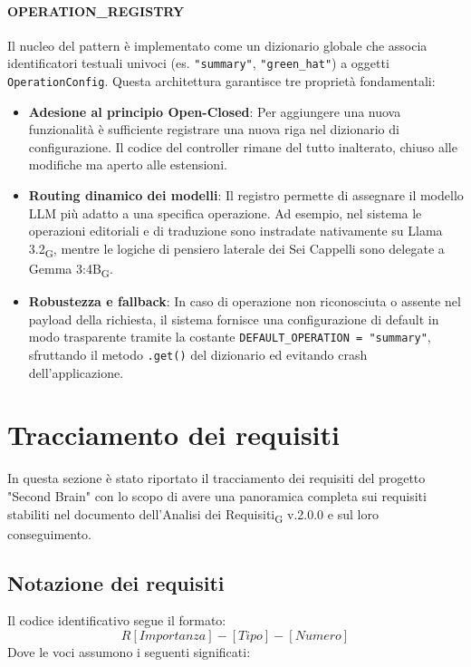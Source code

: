 \documentclass[11pt,a4paper]{article}
\newcommand{\gls}[1]{#1\textsubscript{G}}
\begin{document}
\paragraph{OPERATION\_REGISTRY}
Il nucleo del pattern è implementato come un dizionario globale che associa identificatori testuali univoci (es. \texttt{"summary"}, \texttt{"green\_hat"}) a oggetti \texttt{OperationConfig}. Questa architettura garantisce tre proprietà fondamentali:
\begin{itemize}
    \item \textbf{Adesione al principio Open-Closed}: Per aggiungere una nuova funzionalità è sufficiente registrare una nuova riga nel dizionario di configurazione. Il codice del controller rimane del tutto inalterato, chiuso alle modifiche ma aperto alle estensioni.
    \item \textbf{Routing dinamico dei modelli}: Il registro permette di assegnare il modello LLM più adatto a una specifica operazione. Ad esempio, nel sistema le operazioni editoriali e di traduzione sono instradate nativamente su \gls{Llama 3.2}, mentre le logiche di pensiero laterale dei Sei Cappelli sono delegate a \gls{Gemma 3:4B}.
    \item \textbf{Robustezza e fallback}: In caso di operazione non riconosciuta o assente nel payload della richiesta, il sistema fornisce una configurazione di default in modo trasparente tramite la costante \texttt{DEFAULT\_OPERATION = "summary"}, sfruttando il metodo \texttt{.get()} del dizionario ed evitando crash dell'applicazione.
\end{itemize}



\newpage

\section{Tracciamento dei requisiti}
In questa sezione è stato riportato il tracciamento dei requisiti del progetto "Second Brain" con lo scopo di avere una panoramica completa sui requisiti stabiliti nel documento dell'\gls{Analisi dei Requisiti} v.2.0.0 e sul loro conseguimento.

\subsection{Notazione dei requisiti}
Il codice identificativo segue il formato:
\[
R[Importanza]-[Tipo]-[Numero]
\]
Dove le voci assumono i seguenti significati:
\end{document}
